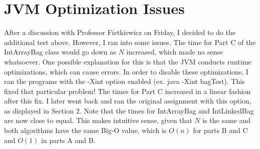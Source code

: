 \documentclass[12pt]{article} %
\begin{document}
\section{JVM Optimization Issues}
After a discussion with Professor Fietkiewicz on Friday, I decided to do the additional test above. However, I ran into some issues. The time for Part C of the IntArrayBag class would go down as $N$ increased, which made no sense whatsoever. One possible explanation for this is that the JVM conducts runtime optimizations, which can cause errors. In order to disable these optimizations, I ran the programs with the -Xint option enabled (ex. java -Xint bagTest). This fixed that particular problem! The times for Part C increased in a linear fashion after this fix. I later went back and ran the original assignment with this option, as displayed in Section 2. Note that the times for IntArrayBag and IntLinkedBag are now close to equal. This makes intuitive sense, given that $N$ is the same and both algorithms have the same Big-O value, which is $O(n)$ for parts B and C and $O(1)$ in parts A and B.
\end{document}
